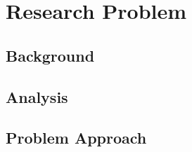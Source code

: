 \section{Research Problem}
\subsection{Background}
\subsection{Analysis}
\subsection{Problem Approach}